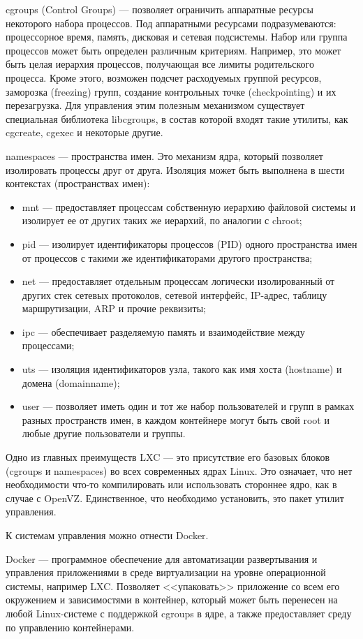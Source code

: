 cgroups (Control Groups) --- позволяет ограничить аппаратные ресурсы некоторого набора процессов.
Под аппаратными ресурсами подразумеваются: процессорное время, память, дисковая и сетевая подсистемы.
Набор или группа процессов может быть определен различным критериям.
Например, это может быть целая иерархия процессов, получающая все лимиты родительского процесса.
Кроме этого, возможен подсчет расходуемых группой ресурсов, заморозка (freezing) групп, создание контрольных точке (checkpointing) и их перезагрузка.
Для управления этим полезным механизмом существует специальная библиотека libcgroups, в состав которой входят такие утилиты, как cgcreate, cgexec и некоторые другие.

namespaces --- пространства имен.
Это механизм ядра, который позволяет изолировать процессы друг от друга.
Изоляция может быть выполнена в шести контекстах (пространствах имен):
\begin{itemize}
  \item mnt --- предоставляет процессам собственную иерархию файловой системы и изолирует ее от других таких же иерархий, по аналогии с chroot;
  \item pid --- изолирует идентификаторы процессов (PID) одного пространства имен от процессов с такими же идентификаторами другого пространства;
  \item net --- предоставляет отдельным процессам логически изолированный от других стек сетевых протоколов, сетевой интерфейс, IP-адрес, таблицу маршрутизации, ARP и прочие реквизиты;
  \item ipc --- обеспечивает разделяемую память и взаимодействие между процессами;
  \item uts --- изоляция идентификаторов узла, такого как имя хоста (hostname) и домена (domainname);
  \item user --- позволяет иметь один и тот же набор пользователей и групп в рамках разных пространств имен, в каждом контейнере могут быть свой root и любые другие пользователи и группы.
\end{itemize}

Одно из главных преимуществ LXC --- это присутствие его базовых блоков (cgroups и namespaces) во всех современных ядрах Linux.
Это означает, что нет необходимости что-то компилировать или использовать стороннее ядро, как в случае с OpenVZ.
Единственное, что необходимо установить, это пакет утилит управления.

К системам управления можно отнести Docker.

Docker --- программное обеспечение для автоматизации развертывания и управления приложениями в среде виртуализации на уровне операционной системы, например LXC.
Позволяет <<упаковать>> приложение со всем его окружением и зависимостями в контейнер, который может быть перенесен на любой Linux-системе с поддержкой cgroups в ядре, а также предоставляет среду по управлению контейнерами.

